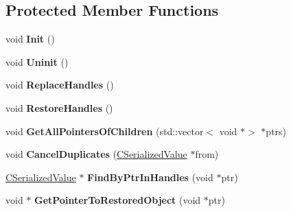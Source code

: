 \subsection*{Protected Member Functions}
\begin{DoxyCompactItemize}
\item 
\mbox{\label{class_c_serialized_value_a1493f597804d5bd6aae80f283f2faf24}} 
void {\bfseries Init} ()
\item 
\mbox{\label{class_c_serialized_value_ac4d2c90f0c2ee9235348394dc96e5f28}} 
void {\bfseries Uninit} ()
\item 
\mbox{\label{class_c_serialized_value_a5d4eb9858c807d9e2536d7518c9bf4fb}} 
void {\bfseries Replace\+Handles} ()
\item 
\mbox{\label{class_c_serialized_value_ad07c4b78db6a79181f02d455a43d12ae}} 
void {\bfseries Restore\+Handles} ()
\item 
\mbox{\label{class_c_serialized_value_a5a2578f3451e1bd999b3dfd88c900d3e}} 
void {\bfseries Get\+All\+Pointers\+Of\+Children} (std\+::vector$<$ void $\ast$$>$ $\ast$ptrs)
\item 
\mbox{\label{class_c_serialized_value_aeefb44cd21c266c6a84c1e41ac949671}} 
void {\bfseries Cancel\+Duplicates} (\hyperlink{class_c_serialized_value}{C\+Serialized\+Value} $\ast$from)
\item 
\mbox{\label{class_c_serialized_value_adcb9fca9006a9924ce0c3158c7c3180d}} 
\hyperlink{class_c_serialized_value}{C\+Serialized\+Value} $\ast$ {\bfseries Find\+By\+Ptr\+In\+Handles} (void $\ast$ptr)
\item 
\mbox{\label{class_c_serialized_value_a3215999697b735b2e097ae6fcb28f7ef}} 
void $\ast$ {\bfseries Get\+Pointer\+To\+Restored\+Object} (void $\ast$ptr)
\end{DoxyCompactItemize}
